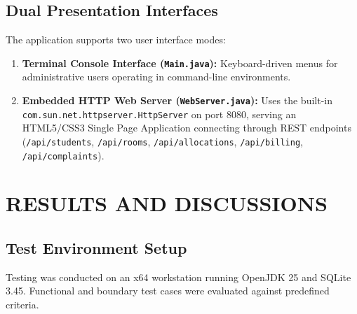 \documentclass[12pt,a4paper]{report}
\begin{document}
\section{Dual Presentation Interfaces}
The application supports two user interface modes:
\begin{enumerate}
\item \textbf{Terminal Console Interface (\texttt{Main.java}):} Keyboard-driven menus for administrative users operating in command-line environments.
\item \textbf{Embedded HTTP Web Server (\texttt{WebServer.java}):} Uses the built-in \texttt{com.sun.net.httpserver.HttpServer} on port 8080, serving an HTML5/CSS3 Single Page Application connecting through REST endpoints (\texttt{/api/students}, \texttt{/api/rooms}, \texttt{/api/allocations}, \texttt{/api/billing}, \texttt{/api/complaints}).
\end{enumerate}

\newpage

\chapter{RESULTS AND DISCUSSIONS}

\section{Test Environment Setup}
Testing was conducted on an x64 workstation running OpenJDK 25 and SQLite 3.45. Functional and boundary test cases were evaluated against predefined criteria.
\end{document}
